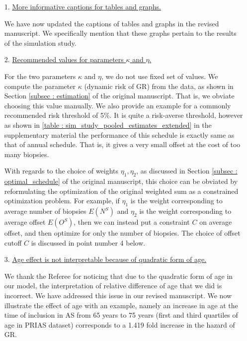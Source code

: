 \begin{enumerate}
    \item[1.] \underline{More informative captions for tables and graphs.}

    We have now updated the captions of tables and graphs in the revised manuscript. We specifically mention that these graphs pertain to the results of the simulation study.
    
    \item[2.] \underline{Recommended values for parameters $\kappa$ and $\eta$.}

    For the two parameters $\kappa$ and $\eta$, we do not use fixed set of values. We compute the parameter $\kappa$ (dynamic risk of GR) from the data, as shown in Section \ref{subsec : estimation} of the original manuscript. That is, we obviate choosing this value manually. We also provide an example for a commonly recommended risk threshold of 5\%. It is quite a risk-averse threshold, however as shown in \ref{table : sim_study_pooled_estimates_extended} in the supplementary material the performance of this schedule is exactly same as that of annual schedule. That is, it gives a very small offset at the cost of too many biopsies.

    With regards to the choice of weights $\eta_1, \eta_2$, as discussed in Section \ref{subsec : optimal_schedule} of the original manuscript, this choice can be obviated by reformulating the optimization of the original weighted sum as a constrained optimization problem. For example, if $\eta_1$ is the weight corresponding to average number of biopsies $E(N^S)$ and $\eta_2$ is the weight corresponding to average offset $E(O^S)$, then we can instead put a constraint $C$ on average offset, and then optimize for only the number of biopsies. The choice of offset cutoff $C$ is discussed in point number 4 below.

    \item[3.] \underline{Age effect is not interpretable because of quadratic form of age.}

    We thank the Referee for noticing that due to the quadratic form of age in our model, the interpretation of relative difference of age that we did is incorrect. We have addressed this issue in our revised manuscript. We now illustrate the effect of age with an example, namely an increase in age at the time of inclusion in AS from 65 years to 75 years (first and third quartiles of age in PRIAS dataset) corresponds to a 1.419 fold increase in the hazard of GR.


\end{enumerate}
